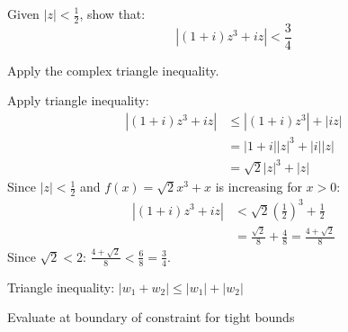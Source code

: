 \begin{problem}
Given $|z| < \frac{1}{2}$, show that:
\[ |(1+i)z^3 + iz| < \frac{3}{4} \]
\end{problem}

\begin{hint}
Apply the complex triangle inequality.
\end{hint}

\begin{solution}
Apply triangle inequality:
\begin{align*}
|(1+i)z^3 + iz| &\le |(1+i)z^3| + |iz|\\
&= |1+i||z|^3 + |i||z|\\
&= \sqrt{2}|z|^3 + |z|
\end{align*}
Since $|z| < \frac{1}{2}$ and $f(x) = \sqrt{2}x^3 + x$ is increasing for $x > 0$:
\begin{align*}
|(1+i)z^3 + iz| &< \sqrt{2}\left(\frac{1}{2}\right)^3 + \frac{1}{2}\\
&= \frac{\sqrt{2}}{8} + \frac{4}{8} = \frac{4 + \sqrt{2}}{8}
\end{align*}
Since $\sqrt{2} < 2$: $\frac{4 + \sqrt{2}}{8} < \frac{6}{8} = \frac{3}{4}$.
\end{solution}

\begin{takeaways}
\item Triangle inequality: $|w_1 + w_2| \le |w_1| + |w_2|$
\item Evaluate at boundary of constraint for tight bounds
\end{takeaways}
